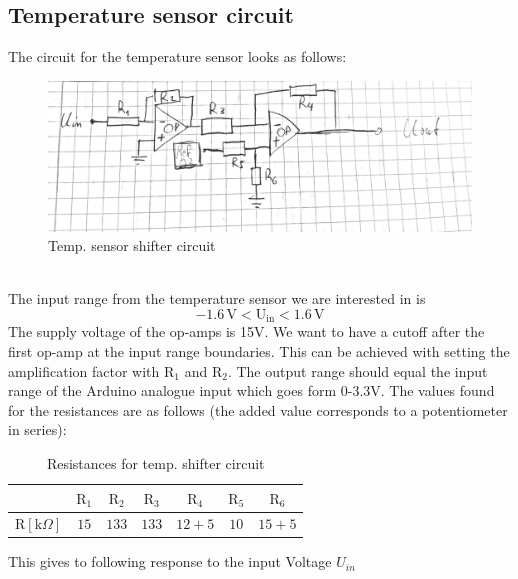 \documentclass[12pt]{scrartcl}
\begin{document}
    \subsection{Temperature sensor circuit}
      The circuit for the temperature sensor looks as follows:
      \begin{figure}[h]
        \includegraphics[width = \textwidth]{circ.png}
        \caption{Temp. sensor shifter circuit}
        \label{fig1}
      \end{figure}
      \\The input range from the temperature sensor we are interested in is
      $$-1.6 \, \text{V} < \text{U}_{\text{in}} < 1.6\, \text{V}$$
      The supply voltage of the op-amps is 15V. We want to have a cutoff after
      the first op-amp at the input range boundaries. This can be achieved with
      setting the amplification factor with $\text{R}_1$ and $\text{R}_2$. The output range
      should equal the input range of the Arduino analogue input which goes form
      0-3.3V. The values found for the resistances are as follows (the added value
      corresponds to a potentiometer in series): \\
      \begin{table}[H]\label{tempres}
        \begin{tabular}{l|c c c c c c}
          & $\text{R}_1$ & $\text{R}_2$ & $\text{R}_3$ & $\text{R}_4$
          & $\text{R}_5$ & $\text{R}_6$ \\
          \hline\vspace{5pt}
          $\text{R}[\text{k}\Omega]$ & $15$ & $133$ & $133$ & $12 + 5$ & $10$
          & $15 + 5$
        \end{tabular}
        \caption{Resistances for temp. shifter circuit}
      \end{table}
      This gives to following response to the input Voltage $U_{in}$\\
\end{document}
